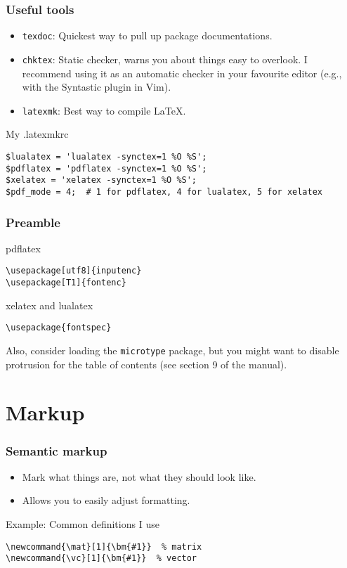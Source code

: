 \documentclass[aspectratio=1610,hyperref={colorlinks,linkcolor=}]{beamer}
\begin{document}
\begin{frame}[fragile]
    \frametitle{Useful tools}
    \begin{itemize}
        \item \texttt{texdoc}: Quickest way to pull up package documentations.
        \item \texttt{chktex}: Static checker, warns you about things easy to overlook. I recommend using it as an automatic checker in your favourite editor (e.g., with the Syntastic plugin in Vim).
        \item \texttt{latexmk}: Best way to compile \LaTeX.
    \end{itemize}
    \begin{beamerboxesrounded}{My .latexmkrc}  %
        \begin{verbatim}
$lualatex = 'lualatex -synctex=1 %O %S';
$pdflatex = 'pdflatex -synctex=1 %O %S';
$xelatex = 'xelatex -synctex=1 %O %S';
$pdf_mode = 4;  # 1 for pdflatex, 4 for lualatex, 5 for xelatex
        \end{verbatim}
    \end{beamerboxesrounded}
\end{frame}

\begin{frame}[fragile]
    \frametitle{Preamble}
    \begin{beamerboxesrounded}{pdflatex}
        \begin{verbatim}
\usepackage[utf8]{inputenc}
\usepackage[T1]{fontenc}
        \end{verbatim}
    \end{beamerboxesrounded}
    \begin{beamerboxesrounded}{xelatex and lualatex}
        \begin{verbatim}
\usepackage{fontspec}
        \end{verbatim}
    \end{beamerboxesrounded}
    Also, consider loading the \texttt{microtype} package, but you might want to disable protrusion for the table of contents (see section 9 of the manual).
\end{frame}

\section{Markup}
\begin{frame}[fragile]
    \frametitle{Semantic markup}
    \begin{itemize}
        \item Mark what things are, not what they should look like.
        \item Allows you to easily adjust formatting.
    \end{itemize}
    \begin{beamerboxesrounded}{Example: Common definitions I use}
        \begin{verbatim}
\newcommand{\mat}[1]{\bm{#1}}  % matrix
\newcommand{\vc}[1]{\bm{#1}}  % vector
        \end{verbatim}
    \end{beamerboxesrounded}
\end{frame}
\end{document}
